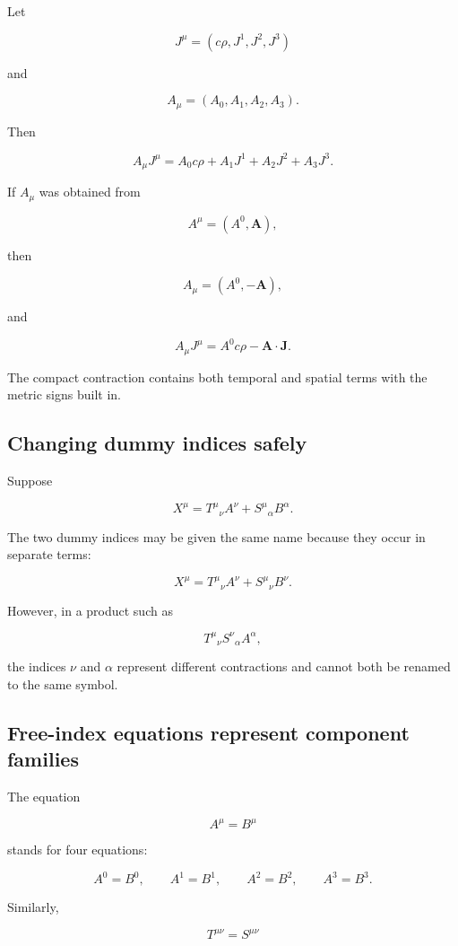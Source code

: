 Let

\[
J^{\mu}=(c\rho,J^{1},J^{2},J^{3})
\]

and

\[
A_{\mu}=(A_{0},A_{1},A_{2},A_{3}).
\]

Then

\[
A_{\mu}J^{\mu}
=
A_{0}c\rho
+A_{1}J^{1}
+A_{2}J^{2}
+A_{3}J^{3}.
\]

If \(A_{\mu}\) was obtained from

\[
A^{\mu}=(A^{0},\mathbf{A}),
\]

then

\[
A_{\mu}=(A^{0},-\mathbf{A}),
\]

and

\[
A_{\mu}J^{\mu}
=
A^{0}c\rho
-
\mathbf{A}\cdot\mathbf{J}.
\]

The compact contraction contains both temporal and spatial terms with the metric signs built in.

\subsection{Changing dummy indices safely}

Suppose

\[
X^{\mu}
=
T^{\mu}{}_{\nu}A^{\nu}
+
S^{\mu}{}_{\alpha}B^{\alpha}.
\]

The two dummy indices may be given the same name because they occur in separate terms:

\[
X^{\mu}
=
T^{\mu}{}_{\nu}A^{\nu}
+
S^{\mu}{}_{\nu}B^{\nu}.
\]

However, in a product such as

\[
T^{\mu}{}_{\nu}
S^{\nu}{}_{\alpha}
A^{\alpha},
\]

the indices \(\nu\) and \(\alpha\) represent different contractions and cannot both be renamed to the same symbol.

\subsection{Free-index equations represent component families}

The equation

\[
A^{\mu}=B^{\mu}
\]

stands for four equations:

\[
A^{0}=B^{0},
\qquad
A^{1}=B^{1},
\qquad
A^{2}=B^{2},
\qquad
A^{3}=B^{3}.
\]

Similarly,

\[
T^{\mu\nu}=S^{\mu\nu}
\]

